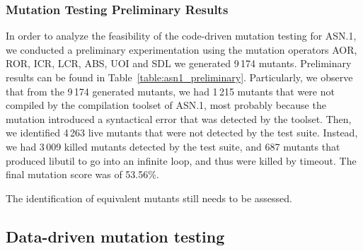 \subsubsection{Mutation Testing Preliminary Results}



In order to analyze the feasibility of the code-driven mutation testing for ASN.1, we conducted a preliminary experimentation using the mutation operators AOR, ROR, ICR, LCR, ABS, UOI and SDL we generated 9\,174 mutants. Preliminary results can be found in Table~\ref{table:asn1_preliminary}.
Particularly, we observe that from the 9\,174 generated mutants, we had 1\,215 mutants that were not compiled by the compilation toolset of ASN.1, most probably because the mutation introduced a syntactical error that was detected by the toolset.
Then, we identified 4\,263 live mutants that were not detected by the test suite. Instead, we had 3\,009 killed mutants detected by the test suite, and 687 mutants that produced libutil to go into an infinite loop, and thus were killed by timeout. The final mutation score was of 53.56\%.

The identification of equivalent mutants still needs to be assessed.


\subsection{Data-driven mutation testing}








